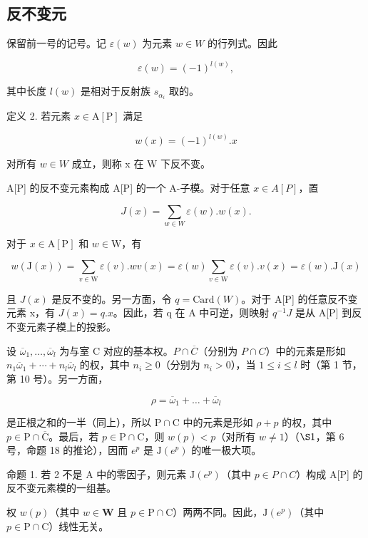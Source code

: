 \subsection{反不变元}

保留前一号的记号。记 \(\varepsilon(w)\) 为元素 \(w \in W\) 的行列式。因此

\[
\varepsilon (w) = (- 1) ^ {l (w)},
\]

其中长度 \(l(w)\) 是相对于反射族 \(s_{\alpha_i}\) 取的。

定义 2. 若元素 \(x \in \mathrm{A}[\mathrm{P}]\) 满足

\[
w (x) = (- 1) ^ {l (w)}. x
\]

对所有 \(w \in W\) 成立，则称 x 在 W 下反不变。

A{[}P{]} 的反不变元素构成 A{[}P{]} 的一个 A-子模。对于任意 \(x \in A[P]\)，置

\[
J (x) = \sum_ {w \in W} \varepsilon (w). w (x).\tag{1}
\]

对于 \(x \in \mathrm{A}[\mathrm{P}]\) 和 \(w \in \mathrm{W}\)，有

\[
w (\mathrm{J} (x)) = \sum_ {v \in \mathrm{W}} \varepsilon (v). w v (x) = \varepsilon (w) \sum_ {v \in \mathrm{W}} \varepsilon (v). v (x) = \varepsilon (w). \mathrm{J} (x)
\]

且 \(J(x)\) 是反不变的。另一方面，令 \(q = \text{Card}(W)\)。对于 A{[}P{]} 的任意反不变元素 x，有 \(J(x) = q.x\)。因此，若 q 在 A 中可逆，则映射 \(q^{-1}J\) 是从 A{[}P{]} 到反不变元素子模上的投影。

设 \(\overline{\omega}_{1},\ldots,\overline{\omega}_{l}\) 为与室 C 对应的基本权。\(P\cap\overline{C}\)（分别为 \(P\cap C\)）中的元素是形如 \(n_{1}\overline{\omega}_{1}+\cdots+n_{l}\overline{\omega}_{l}\) 的权，其中 \(n_{i}\geqslant0\)（分别为 \(n_{i}>0\)），当 \(1\leqslant i\leqslant l\) 时（第 1 节，第 10 号）。另一方面，

\[
\rho = \overline {{\omega}} _ {1} + \dots + \overline {{\omega}} _ {l}
\]

是正根之和的一半（同上），所以 \(\mathrm{P} \cap \mathrm{C}\) 中的元素是形如 \(\rho + p\) 的权，其中 \(p \in \mathrm{P} \cap \overline{\mathrm{C}}\)。最后，若 \(p \in \mathrm{P} \cap \mathrm{C}\)，则 \(w(p) < p\)（对所有 \(w \neq 1\)）（\(\S 1\)，第 6 号，命题 18 的推论），因而 \(e^p\) 是 \(\mathrm{J}(e^p)\) 的唯一极大项。

命题 1. 若 2 不是 A 中的零因子，则元素 \(\mathrm{J}(e^{p})\)（其中 \(p \in P \cap C\)）构成 A{[}P{]} 的反不变元素模的一组基。

权 \(w(p)\)（其中 \(w \in \mathbf{W}\) 且 \(p \in \mathrm{P} \cap \mathrm{C}\)）两两不同。因此，\(\mathrm{J}(e^p)\)（其中 \(p \in \mathrm{P} \cap \mathrm{C}\)）线性无关。

